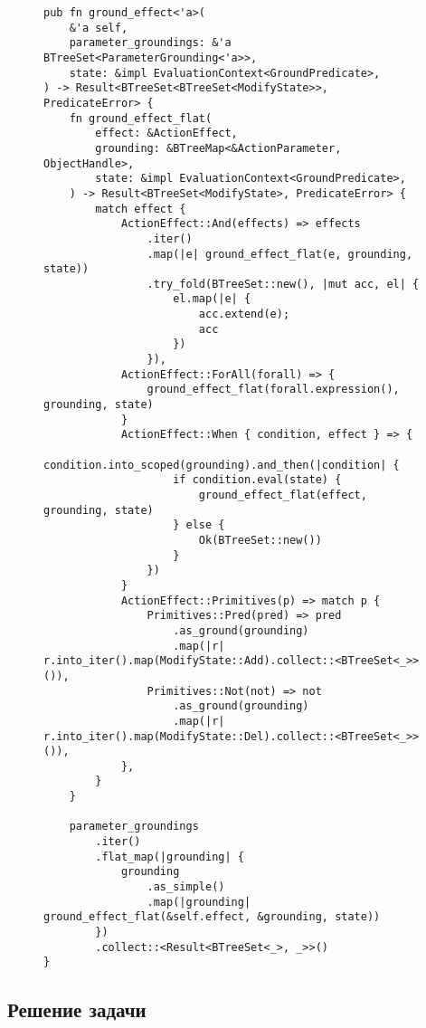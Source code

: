 \documentclass{article}
\begin{document}
\begin{figure}
  \begin{verbatim}
pub fn ground_effect<'a>(
    &'a self,
    parameter_groundings: &'a BTreeSet<ParameterGrounding<'a>>,
    state: &impl EvaluationContext<GroundPredicate>,
) -> Result<BTreeSet<BTreeSet<ModifyState>>, PredicateError> {
    fn ground_effect_flat(
        effect: &ActionEffect,
        grounding: &BTreeMap<&ActionParameter, ObjectHandle>,
        state: &impl EvaluationContext<GroundPredicate>,
    ) -> Result<BTreeSet<ModifyState>, PredicateError> {
        match effect {
            ActionEffect::And(effects) => effects
                .iter()
                .map(|e| ground_effect_flat(e, grounding, state))
                .try_fold(BTreeSet::new(), |mut acc, el| {
                    el.map(|e| {
                        acc.extend(e);
                        acc
                    })
                }),
            ActionEffect::ForAll(forall) => {
                ground_effect_flat(forall.expression(), grounding, state)
            }
            ActionEffect::When { condition, effect } => {
                condition.into_scoped(grounding).and_then(|condition| {
                    if condition.eval(state) {
                        ground_effect_flat(effect, grounding, state)
                    } else {
                        Ok(BTreeSet::new())
                    }
                })
            }
            ActionEffect::Primitives(p) => match p {
                Primitives::Pred(pred) => pred
                    .as_ground(grounding)
                    .map(|r| r.into_iter().map(ModifyState::Add).collect::<BTreeSet<_>>()),
                Primitives::Not(not) => not
                    .as_ground(grounding)
                    .map(|r| r.into_iter().map(ModifyState::Del).collect::<BTreeSet<_>>()),
            },
        }
    }

    parameter_groundings
        .iter()
        .flat_map(|grounding| {
            grounding
                .as_simple()
                .map(|grounding| ground_effect_flat(&self.effect, &grounding, state))
        })
        .collect::<Result<BTreeSet<_>, _>>()
}
  \end{verbatim}
  \label{code:groundeffect}
\end{figure}

\subsection{Решение задачи}
\end{document}

